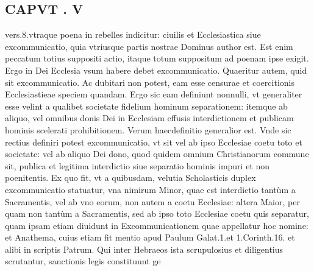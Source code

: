 \documentclass{article}
\begin{document}
\begin{pages}
\section*{CAPVT . V }\pstart vers.8.vtraque poena in rebelles indicitur: ciuilis et Ecclesiastica siue excommunicatio, quia vtriusque  partis nostrae Dominus author est. Est enim peccatum totius suppositi actio, itaque totum suppositum ad poenam ipse exigit.  \pend\pstart Ergo in Dei Ecclesia vsum habere debet excommunicatio.  \pend\pstart Quaeritur autem, quid sit excommunicatio. Ac dubitari non potest, eam esse censurae et coercitionis Ecclesiastieae speciem quandam. Ergo sic eam definiunt nonnulli, vt generaliter esse velint a qualibet societate fidelium hominum separationem: itemque ab aliquo, vel omnibus donis Dei in Ecclesiam effusis interdictionem et publicam hominis scelerati prohibitionem. Verum haecdefinitio generalior est. Vnde sic rectius definiri potest excommunicatio, vt sit vel ab ipso Ecclesiae coetu toto et societate: vel ab aliquo Dei dono, quod quidem omnium Christianorum commune sit, publica et legitima interdictio siue separatio hominis impuri et non poenitentis. Ex quo fit, vt a quibusdam, velutia Scholasticis duplex excommunicatio statuatur, vna nimirum Minor, quae est interdictio tantùm a Sacramentis, vel ab vno eorum, non autem a coetu Ecclesiae: altera Maior, per quam non tantùm a Sacramentis, sed ab ipso toto Ecclesiae coetu quis separatur, quam ipsam etiam diuidunt in Excommunicationem quae appellatur hoc nomine: et Anathema, cuius etiam fit mentio apud Paulum Galat.1.et 1.Corinth.16. et alibi in scriptis Patrum.  \pend\pstart Qui inter Hebraeos ista scrupulosius et diligentius scrutantur, sanctionis legis constituunt ge\pend

\end{pages}
\end{document}
